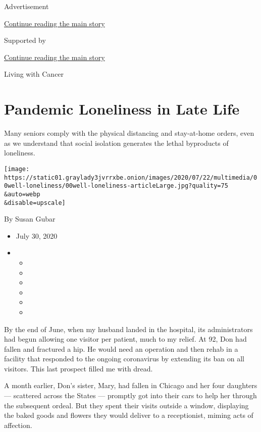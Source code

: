 Advertisement

\protect\hyperlink{after-top}{Continue reading the main story}

Supported by

\protect\hyperlink{after-sponsor}{Continue reading the main story}

Living with Cancer

\hypertarget{pandemic-loneliness-in-late-life}{%
\section{Pandemic Loneliness in Late
Life}\label{pandemic-loneliness-in-late-life}}

Many seniors comply with the physical distancing and stay-at-home
orders, even as we understand that social isolation generates the lethal
byproducts of loneliness.

\texttt{[image: https://static01.graylady3jvrrxbe.onion/images/2020/07/22/multimedia/00well-loneliness/00well-loneliness-articleLarge.jpg?quality=75\\\&auto=webp\\\&disable=upscale]}

By Susan Gubar

\begin{itemize}
\item
  July 30, 2020
\item
  \begin{itemize}
  \item
  \item
  \item
  \item
  \item
  \item
  \end{itemize}
\end{itemize}

By the end of June, when my husband landed in the hospital, its
administrators had begun allowing one visitor per patient, much to my
relief. At 92, Don had fallen and fractured a hip. He would need an
operation and then rehab in a facility that responded to the ongoing
coronavirus by extending its ban on all visitors. This last prospect
filled me with dread.

A month earlier, Don's sister, Mary, had fallen in Chicago and her four
daughters --- scattered across the States --- promptly got into their
cars to help her through the subsequent ordeal. But they spent their
visits outside a window, displaying the baked goods and flowers they
would deliver to a receptionist, miming acts of affection.


